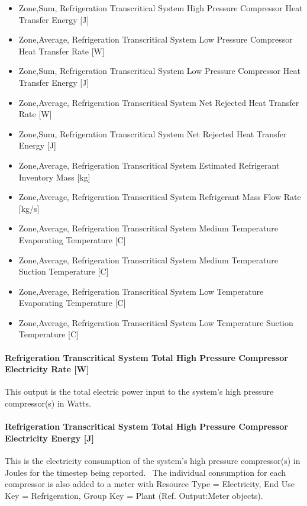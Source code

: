 \begin{itemize}
\item
  Zone,Sum, Refrigeration Transcritical System High Pressure Compressor Heat Transfer Energy {[}J{]}
\item
  Zone,Average, Refrigeration Transcritical System Low Pressure Compressor Heat Transfer Rate {[}W{]}
\item
  Zone,Sum, Refrigeration Transcritical System Low Pressure Compressor Heat Transfer Energy {[}J{]}
\item
  Zone,Average, Refrigeration Transcritical System Net Rejected Heat Transfer Rate {[}W{]}
\item
  Zone,Sum, Refrigeration Transcritical System Net Rejected Heat Transfer Energy {[}J{]}
\item
  Zone,Average, Refrigeration Transcritical System Estimated Refrigerant Inventory Mass {[}kg{]}
\item
  Zone,Average, Refrigeration Transcritical System Refrigerant Mass Flow Rate {[}kg/s{]}
\item
  Zone,Average, Refrigeration Transcritical System Medium Temperature Evaporating Temperature {[}C{]}
\item
  Zone,Average, Refrigeration Transcritical System Medium Temperature Suction Temperature {[}C{]}
\item
  Zone,Average, Refrigeration Transcritical System Low Temperature Evaporating Temperature {[}C{]}
\item
  Zone,Average, Refrigeration Transcritical System Low Temperature Suction Temperature {[}C{]}
\end{itemize}

\paragraph{Refrigeration Transcritical System Total High Pressure Compressor Electricity Rate {[}W{]}}\label{refrigeration-transcritical-system-total-high-pressure-compressor-electric-power-w}

This output is the total electric power input to the system's high pressure compressor(s) in Watts.

\paragraph{Refrigeration Transcritical System Total High Pressure Compressor Electricity Energy {[}J{]}}\label{refrigeration-transcritical-system-total-high-pressure-compressor-electric-energy-j}

This is the electricity consumption of the system's high pressure compressor(s) in Joules for the timestep being reported.~ The individual consumption for each compressor is also added to a meter with Resource Type = Electricity, End Use Key = Refrigeration, Group Key = Plant (Ref. Output:Meter objects).

